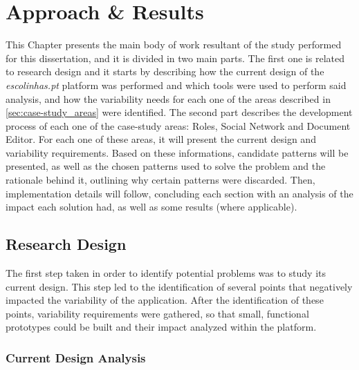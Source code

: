 \chapter{Approach \& Results}\label{chap:approach_results}

This Chapter presents the main body of work resultant of the study performed for this dissertation, and it is divided in two main parts. The first one is related to research design and it starts by describing how the current design of the \emph{escolinhas.pt} platform was performed and which tools were used to perform said analysis, and how the variability needs for each one of the areas described in \ref{sec:case-study_areas} were identified. The second part describes the development process of each one of the case-study areas: Roles, Social Network and Document Editor. For each one of these areas, it will present the current design and variability requirements. Based on these informations, candidate patterns will be presented, as well as the chosen patterns used to solve the problem and the rationale behind it, outlining why certain patterns were discarded. Then, implementation details will follow, concluding each section with an analysis of the impact each solution had, as well as some results (where applicable).

\section{Research Design}\label{sec:research_design}

The first step taken in order to identify potential problems was to study its current design. This step led to the identification of several points that negatively impacted the variability of the application. After the identification of these points, variability requirements were gathered, so that small, functional prototypes could be built and their impact analyzed within the platform.

\subsection{Current Design Analysis}\label{sec:current_design_analysis}

